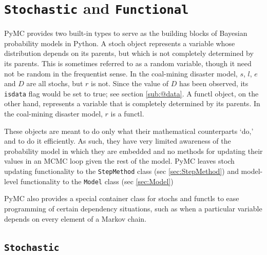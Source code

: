 \documentclass[]{book}
\begin{document}
\section{\texttt{Stochastic} and \texttt{Functional}}\label{sec:PyMCObjects}
PyMC provides two built-in types to serve as the building blocks of Bayesian probability models in Python. A stoch object represents a variable whose distribution depends on its parents, but which is not completely determined by its parents. This is sometimes referred to as a random variable, though it need not be random in the frequentist sense. In the coal-mining disaster model, $s$, $l$, $e$ and $D$ are all stochs, but $r$ is not. Since the value of $D$ has been observed, its \texttt{isdata} flag would be set to true; see section \ref{sub:@data}. A functl object, on the other hand, represents a variable that is completely determined by its parents. In the coal-mining disaster model, $r$ is a functl.

These objects are meant to do only what their mathematical counterparts `do,' and to do it efficiently. As such, they have very limited awareness of the probability model in which they are embedded and no methods for updating their values in an MCMC loop given the rest of the model. PyMC leaves stoch updating functionality to the \texttt{StepMethod} class (sec \ref{sec:StepMethod}) and model-level functionality to the \texttt{Model} class (sec \ref{sec:Model})

PyMC also provides a special container class for stochs and functls to ease programming of certain dependency situations, such as when a particular variable depends on every element of a Markov chain.

\subsection{\texttt{Stochastic}}\label{sub:stoch}
\end{document}
